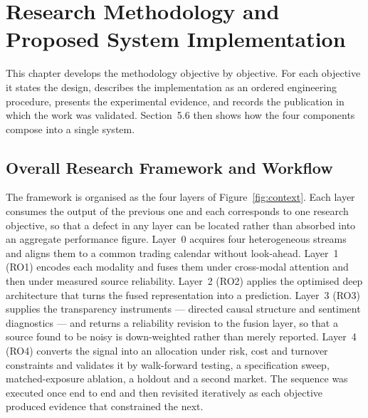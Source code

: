 \chapter{Research Methodology and Proposed System Implementation}

This chapter develops the methodology objective by objective. For each objective it states
the design, describes the implementation as an ordered engineering procedure, presents the
experimental evidence, and records the publication in which the work was validated.
Section~5.6 then shows how the four components compose into a single system.

\section{Overall Research Framework and Workflow}

The framework is organised as the four layers of Figure~\ref{fig:context}. Each layer consumes
the output of the previous one and each corresponds to one research objective, so that a defect
in any layer can be located rather than absorbed into an aggregate performance figure. Layer~0
acquires four heterogeneous streams and aligns them to a common trading calendar without
look-ahead. Layer~1 (RO1) encodes each modality and fuses them under cross-modal attention and
then under measured source reliability. Layer~2 (RO2) applies the optimised deep architecture
that turns the fused representation into a prediction. Layer~3 (RO3) supplies the transparency
instruments --- directed causal structure and sentiment diagnostics --- and returns a
reliability revision to the fusion layer, so that a source found to be noisy is down-weighted
rather than merely reported. Layer~4 (RO4) converts the signal into an allocation under risk,
cost and turnover constraints and validates it by walk-forward testing, a specification sweep,
matched-exposure ablation, a holdout and a second market. The sequence was executed once end to
end and then revisited iteratively as each objective produced evidence that constrained the
next.

